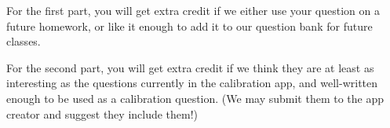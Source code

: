\documentclass[11pt]{article}
\begin{document}
For the first part, you will get extra credit if we either use your question on a future homework, 
or like it enough to add it to our question bank for future classes.

For the second part, you will get extra credit if we think they are at least as interesting as the 
questions currently in the calibration app, and well-written enough to be used as a calibration question. 
(We may submit them to the app creator and suggest they include them!)
\end{document}

